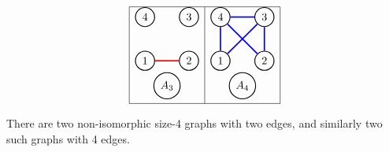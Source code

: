 \[
    \begin{array}{|l|l|}
        \hline
        \begin{tikzpicture}
        [scale=.2]
        \begin{scope}[every node/.style={circle,thick,draw}]
            \node (1) at (0,4) {1};
            \node (2) at (7,4) {2};
            \node (3) at (7,11) {3};
            \node (4) at (0,11) {4};
           \node(A) at (3.5,0) {$A_3$};
        \end{scope}

        \begin{scope}[%
                      every node/.style={fill=white,circle},
                      every edge/.style={draw=red,very thick}]
              \draw (1) edge  (2);
        \end{scope}
        \end{tikzpicture}
        &
        \begin{tikzpicture}
        [scale=.2]
        \begin{scope}[every node/.style={circle,thick,draw}]
            \node (1) at (0,4) {1};
            \node (2) at (7,4) {2};
            \node (3) at (7,11) {3};
            \node (4) at (0,11) {4};
           \node(A) at (3.5,0) {$A_4$};
        \end{scope}

        \begin{scope}[%
                      every node/.style={fill=white,circle},
                      every edge/.style={draw=blue,very thick}]
             \draw (2) edge  (3);
             \draw (3) edge  (4);
             \draw (4) edge  (1);
             \draw (4) edge  (2);
             \draw (3) edge  (1);
                     
        \end{scope}
        \end{tikzpicture}\\
        \hline
    \end{array}
\]

There are two non-isomorphic size-4 graphs with two edges, and similarly two such graphs with 4 edges. 

